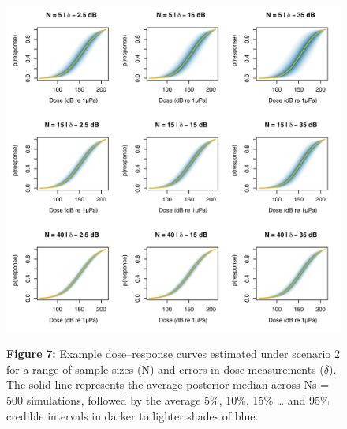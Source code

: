 \documentclass[
]{article}
\begin{document}
\begin{figure}

{\centering \includegraphics[width=1\linewidth]{fig/fig_doseresponse_S2} 

}

\textbf{Figure }{\textbf{7:} \hypertarget{fig7}{}Example dose--response curves estimated under scenario 2 for a range of sample sizes (N) and errors in dose measurements (\(\delta\)). The solid line represents the average posterior median across Ns = 500 simulations, followed by the average 5\%, 10\%, 15\% \ldots{} and 95\% credible intervals in darker to lighter shades of blue.}\label{fig:unnamed-chunk-6}
\end{figure}
\end{document}
